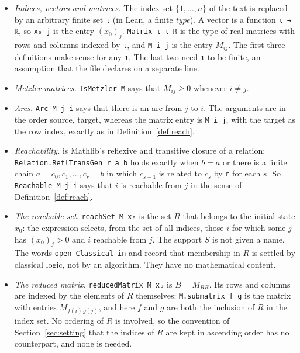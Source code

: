 \documentclass[11pt]{article}
\theoremstyle{definition}
\theoremstyle{remark}
\begin{document}
\begin{itemize}[leftmargin=2em]
  \item \emph{Indices, vectors and matrices.} The index set $\{1, \dots, n\}$ of the text is
        replaced by an arbitrary finite set \verb|ι| (in Lean, a finite \emph{type}). A vector is
        a function \verb|ι → ℝ|, so \verb|x₀ j| is the entry $(x_0)_j$. \verb|Matrix ι ι ℝ| is the
        type of real matrices with rows and columns indexed by \verb|ι|, and \verb|M i j| is the
        entry $M_{ij}$. The first three definitions make sense for any \verb|ι|. The last two need
        \verb|ι| to be finite, an assumption that the file declares on a separate line.
  \item \emph{Metzler matrices.} \verb|IsMetzler M| says that $M_{ij} \ge 0$ whenever $i \ne j$.
  \item \emph{Arcs.} \verb|Arc M j i| says that there is an arc from $j$ to $i$. The arguments are
        in the order source, target, whereas the matrix entry is \verb|M i j|, with the target as
        the row index, exactly as in Definition~\ref{def:reach}.
  \item \emph{Reachability.}  is Mathlib's reflexive and transitive
        closure of a relation: \verb|Relation.ReflTransGen r a b| holds exactly when $b = a$ or
        there is a finite chain $a = c_0, c_1, \dots, c_r = b$ in which $c_{s-1}$ is related to
        $c_s$ by \verb|r| for each $s$. So \verb|Reachable M j i| says that $i$ is reachable
        from $j$ in the sense of Definition~\ref{def:reach}.
  \item \emph{The reachable set.} \verb|reachSet M x₀| is the set $R$ that belongs to the initial
        state $x_0$: the expression  selects, from the set of all
        indices, those $i$ for which some $j$ has $(x_0)_j > 0$ and $i$ reachable from $j$. The
        support $S$ is not given a name. The words \verb|open Classical in| and
         record that membership in $R$ is settled by classical logic, not by
        an algorithm. They have no mathematical content.
  \item \emph{The reduced matrix.} \verb|reducedMatrix M x₀| is $B = M_{RR}$. Its rows and columns
        are indexed by the elements of $R$ themselves: \verb|M.submatrix f g| is the matrix with
        entries $M_{f(i)\,g(j)}$, and here $f$ and $g$ are both the inclusion of $R$ in the index
        set. No ordering of $R$ is involved, so the convention of Section~\ref{sec:setting} that
        the indices of $R$ are kept in ascending order has no counterpart, and none is needed.
\end{itemize}
\end{document}
